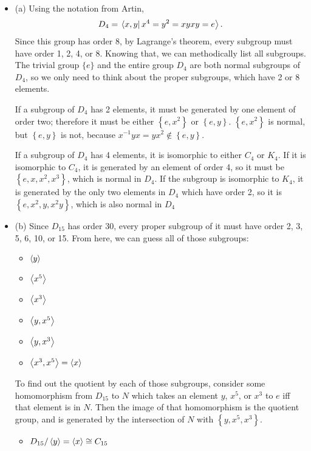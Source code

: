 \documentclass{article}
\begin{document}
\begin{itemize}
    \item (a) Using the notation from Artin,
        \[ D_4 = \left.\left\langle x,y\right\vert x^4=y^2=xyxy=e \right\rangle. \]
        Since this group has order 8, by Lagrange's theorem, every subgroup must have order 1, 2, 4, or 8. Knowing that, we can methodically list all subgroups. The trivial group $\{e\}$ and the entire group $D_4$ are both normal subgroups of $D_4$, so we only need to think about the proper subgroups, which have 2 or 8 elements.
        \par
        If a subgroup of $D_4$ has 2 elements, it must be generated by one element of order two; therefore it must be either $ \left\{ e, x^2 \right\}$ or $ \left\{ e, y \right\}$. $ \left\{ e, x^2 \right\}$ is normal, but $ \left\{ e, y \right\}$ is not, because $x^{-1}yx=yx^2 \not\in \left\{ e, y \right\}$. 
        \par
        If a subgroup of $D_4$ has 4 elements, it is isomorphic to either $C_4$ or $K_4$. If it is isomorphic to $C_4$, it is generated by an element of order 4, so it must be $ \left\{ e, x, x^2, x^3 \right\}$, which is normal in $D_4$. If the subgroup is isomorphic to $K_4$, it is generated by the only two elements in $D_4$ which have order 2, so it is $ \left\{ e, x^2, y, x^2y \right\}$, which is also normal in $D_4$
    \item (b) Since $D_{15}$ has order 30, every proper subgroup of it must have order 2, 3, 5, 6, 10, or 15. From here, we can guess all of those subgroups:
        \begin{itemize}
            \item $\left\langle y \right\rangle$
            \item $\left\langle x^5 \right\rangle$
            \item $\left\langle x^3 \right\rangle$
            \item $\left\langle y, x^5 \right\rangle$
            \item $\left\langle y, x^3 \right\rangle$
            \item $\left\langle x^3, x^5 \right\rangle = \left\langle x \right\rangle$
        \end{itemize}
        To find out the quotient by each of those subgroups, consider some homomorphism from $D_{15}$ to $N$ which takes an element $y$, $x^5$, or $x^3$ to $e$ iff that element is in $N$. Then the image of that homomorphism is the quotient group, and is generated by the intersection of $N$ with $ \left\{ y, x^5, x^3 \right\}$.
        \begin{itemize}
            \item $D_{15} / \left\langle y \right\rangle = \left\langle x \right\rangle \cong C_{15}$

\end{itemize}
\end{itemize}
\end{document}
